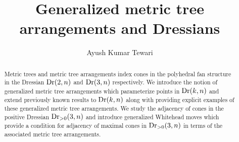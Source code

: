 \documentclass[10pt,a4paper]{amsart}
\DeclareMathOperator{\Dr}{\rm Dr}
\theoremstyle{plain}
\theoremstyle{definition}
\numberwithin{subcase}{case}
\begin{document}
\title{Generalized metric tree arrangements and Dressians}
\author{Ayush Kumar Tewari}
\address{Johann Radon Institute for Computational and Applied Mathematics (RICAM)\\
Austrian Academy of Sciences, Linz, Austria}
\begin{abstract}
Metric trees and metric tree arrangements index cones in the polyhedral fan structure in the Dressian $\Dr(2,n)$ and $\Dr(3,n)$ respectively. We introduce the notion of generalized metric tree arrangements which parameterize points in $\Dr(k,n)$ and extend previously known results to $\Dr(k,n)$ along with providing explicit examples of these generalized metric tree arrangements. We study the adjacency of cones in the positive Dressian $\Dr_{>0}(3, n)$ and introduce generalized Whitehead moves which provide a condition for adjacency of maximal cones in $\Dr_{>0}(3,n)$ in terms of the associated metric tree arrangements. 
\end{abstract}
\end{document}
